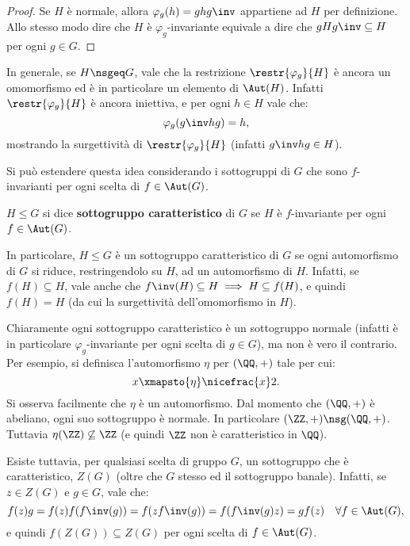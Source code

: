 \documentclass[12pt]{scrartcl}
\begin{document}
	\begin{proof}
		Se $H$ è normale, allora $\varphi_g(h) = g h g\inv$ appartiene ad $H$ per
		definizione. Allo stesso modo dire che $H$ è $\varphi_g$-invariante
		equivale a dire che $gHg\inv \subseteq H$ per ogni $g \in G$.
	\end{proof} \bigskip


	In generale, se $H \nsgeq G$, vale che la restrizione $\restr{\varphi_g}{H}$ è
	ancora un omomorfismo ed è in particolare un elemento di $\Aut(H)$. Infatti
	$\restr{\varphi_g}{H}$ è ancora iniettiva, e per ogni $h \in H$ vale che:
	\[ \varphi_g(g\inv h g) = h, \]
	mostrando la surgettività di $\restr{\varphi_g}{H}$ (infatti $g\inv h g \in H$). \bigskip


	Si può estendere questa idea considerando i sottogruppi di $G$ che sono $f$-invarianti
	per ogni scelta di $f \in \Aut(G)$.
	
	\begin{definition}
		$H \leq G$ si dice \textbf{sottogruppo caratteristico} di $G$ se $H$
		è $f$-invariante per ogni $f \in \Aut(G)$.
	\end{definition} \smallskip
	
	In particolare, $H \leq G$ è un sottogruppo caratteristico di $G$ se ogni
	automorfismo di $G$ si riduce, restringendolo su $H$, ad un automorfismo
	di $H$. Infatti, se $f(H) \subseteq H$, vale anche che $f\inv(H) \subseteq H \implies
	H \subseteq f(H)$, e quindi $f(H) = H$ (da cui la surgettività dell'omomorfismo
	in $H$). \bigskip
	

	Chiaramente ogni sottogruppo caratteristico è un sottogruppo normale (infatti è
	in particolare $\varphi_g$-invariante per ogni scelta di $g \in G$), ma non è
	vero il contrario. Per esempio, si definisca l'automorfismo $\eta$ per $(\QQ, +)$
	tale per cui:
	\[ x \xmapsto{\eta} \nicefrac{x}2. \]
	Si osserva facilmente che $\eta$ è un automorfismo. Dal momento che $(\QQ, +)$ è
	abeliano, ogni suo sottogruppo è normale. In particolare $(\ZZ, +) \nsg (\QQ, +)$.
	Tuttavia $\eta(\ZZ) \not\subseteq \ZZ$ (e quindi $\ZZ$ non è caratteristico in $\QQ$). \bigskip
	
	
	Esiste tuttavia, per qualsiasi scelta di gruppo $G$, un sottogruppo che è caratteristico,
	$Z(G)$ (oltre che $G$ stesso ed il sottogruppo banale). Infatti, se $z \in Z(G)$ e
	$g \in G$, vale che:
	\[ f(z)g = f(z)f(f\inv(g)) = f(z f\inv(g)) = f(f\inv(g) z) = g f(z) \quad \forall f \in \Aut(G), \]
	e quindi $f(Z(G)) \subseteq Z(G)$ per ogni scelta di $f \in \Aut(G)$. \bigskip
	
\end{document}
